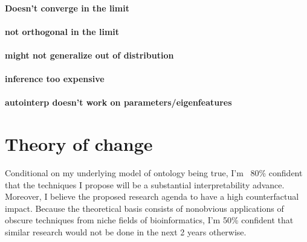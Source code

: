 \paragraph{Doesn't converge in the limit}
\paragraph{not orthogonal in the limit}

\paragraph{might not generalize out of distribution}

\paragraph{inference too expensive}

\paragraph{autointerp doesn't work on parameters/eigenfeatures}

\section{Theory of change}
Conditional on my underlying model of ontology being true, 
I'm ~80\% confident that the techniques I propose will be a substantial interpretability advance.
Moreover, I believe the proposed research agenda to have a high counterfactual impact.
Because the theoretical basis consists of nonobvious applications of obscure techniques from 
niche fields of bioinformatics, I'm 50\% confident that similar research would not be done in the 
next 2 years otherwise.

